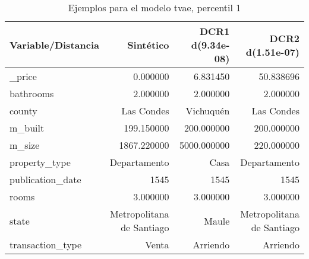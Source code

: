\begin{table}[H]
\centering
\fontsize{10}{14}\selectfont
\caption{Ejemplos para el modelo tvae, percentil 1}
\label{table-example-economicos-a-2-tvae-1p}
\begin{tabular}{|l|r|r|r|}
\hline
\rowcolor[gray]{0.8}
Variable/Distancia & Sintético & DCR1 d(9.34e-08) & DCR2 d(1.51e-07) \\
\hline \_price & \cellcolor[rgb]{0.9, 0.54, 0.52} 0.000000 & 6.831450 & 50.838696 \\
\hline bathrooms & \cellcolor[rgb]{0.9, 0.54, 0.52} 2.000000 & \cellcolor[rgb]{0.9, 0.54, 0.52} 2.000000 & \cellcolor[rgb]{0.9, 0.54, 0.52} 2.000000 \\
\hline county & \cellcolor[rgb]{0.9, 0.54, 0.52} Las Condes & Vichuquén & \cellcolor[rgb]{0.9, 0.54, 0.52} Las Condes \\
\hline m\_built & \cellcolor[rgb]{0.9, 0.54, 0.52} 199.150000 & 200.000000 & 200.000000 \\
\hline m\_size & \cellcolor[rgb]{0.9, 0.54, 0.52} 1867.220000 & 5000.000000 & 220.000000 \\
\hline property\_type & \cellcolor[rgb]{0.9, 0.54, 0.52} Departamento & Casa & \cellcolor[rgb]{0.9, 0.54, 0.52} Departamento \\
\hline publication\_date & \cellcolor[rgb]{0.9, 0.54, 0.52} 1545 & \cellcolor[rgb]{0.9, 0.54, 0.52} 1545 & \cellcolor[rgb]{0.9, 0.54, 0.52} 1545 \\
\hline rooms & \cellcolor[rgb]{0.9, 0.54, 0.52} 3.000000 & \cellcolor[rgb]{0.9, 0.54, 0.52} 3.000000 & \cellcolor[rgb]{0.9, 0.54, 0.52} 3.000000 \\
\hline state & \cellcolor[rgb]{0.9, 0.54, 0.52} Metropolitana de Santiago & Maule & \cellcolor[rgb]{0.9, 0.54, 0.52} Metropolitana de Santiago \\
\hline transaction\_type & \cellcolor[rgb]{0.9, 0.54, 0.52} Venta & Arriendo & Arriendo \\
\hline
\end{tabular}
\end{table}

